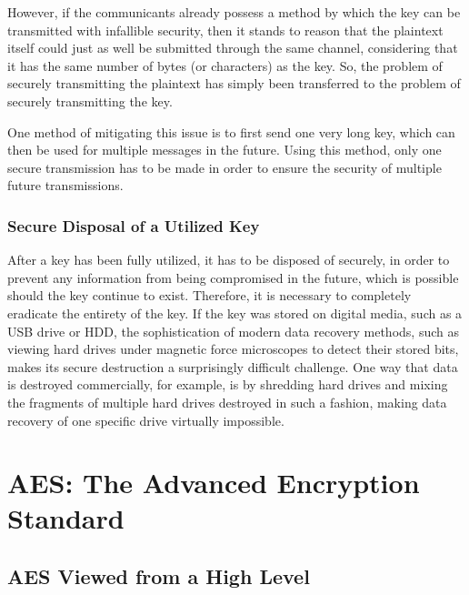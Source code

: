 \documentclass[12pt, a4paper]{report}
\theoremstyle{definition}
\theoremstyle{remark}
\begin{document}
However, if the communicants already possess a method by which the key can be transmitted with infallible security, then it stands to reason that the plaintext itself could just as well be submitted through the same channel, considering that it has the same number of bytes (or characters) as the key. So, the problem of securely transmitting the plaintext has simply been transferred to the problem of securely transmitting the key.

One method of mitigating this issue is to first send one very long key, which can then be used for multiple messages in the future. Using this method, only one secure transmission has to be made in order to ensure the security of multiple future transmissions. 

\subsection{Secure Disposal of a Utilized Key}
After a key has been fully utilized, it has to be disposed of securely, in order to prevent any information from being compromised in the future, which is possible should the key continue to exist. Therefore, it is necessary to completely eradicate the entirety of the key. If the key was stored on digital media, such as a USB drive or HDD, the sophistication of modern data recovery methods, such as viewing hard drives under magnetic force microscopes to detect their stored bits\cite{DataRecovery}, makes its secure destruction a surprisingly difficult challenge. One way that data is destroyed commercially, for example, is by shredding hard drives and mixing the fragments of multiple hard drives destroyed in such a fashion, making data recovery of one specific drive virtually impossible\cite{HDDDestruction}.


\chapter{AES: The Advanced Encryption Standard}

\section{AES Viewed from a High Level}
\end{document}
